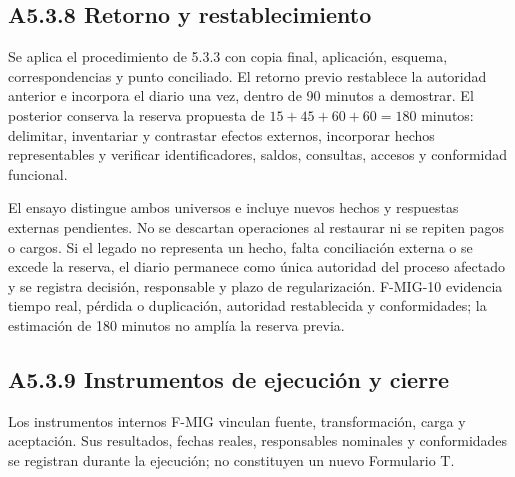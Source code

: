\subsection*{A5.3.8 Retorno y restablecimiento}

Se aplica el procedimiento de 5.3.3 con copia final, aplicación, esquema, correspondencias y punto conciliado. El retorno previo restablece la autoridad anterior e incorpora el diario una vez, dentro de 90 minutos a demostrar. El posterior conserva la reserva propuesta de \(15+45+60+60=180\) minutos: delimitar, inventariar y contrastar efectos externos, incorporar hechos representables y verificar identificadores, saldos, consultas, accesos y conformidad funcional.

El ensayo distingue ambos universos e incluye nuevos hechos y respuestas externas pendientes. No se descartan operaciones al restaurar ni se repiten pagos o cargos. Si el legado no representa un hecho, falta conciliación externa o se excede la reserva, el diario permanece como única autoridad del proceso afectado y se registra decisión, responsable y plazo de regularización. F-MIG-10 evidencia tiempo real, pérdida o duplicación, autoridad restablecida y conformidades; la estimación de 180 minutos no amplía la reserva previa.

\subsection*{A5.3.9 Instrumentos de ejecución y cierre}

Los instrumentos internos F-MIG vinculan fuente, transformación, carga y aceptación. Sus resultados, fechas reales, responsables nominales y conformidades se registran durante la ejecución; no constituyen un nuevo Formulario T.

